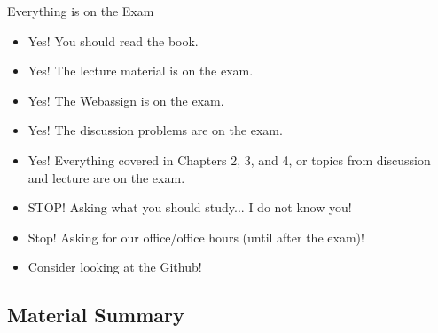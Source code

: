 \documentclass[t,10pt,mathserif,xcolor=pst,pdftex]{beamer}
\begin{document}
\begin{frame}{Everything is on the Exam}

\begin{itemize}
\item Yes! You should read the book.
\end{itemize}

\begin{itemize}
\item Yes! The lecture material is on the exam.
\end{itemize}

\begin{itemize}
\item Yes! The Webassign is on the exam.
\end{itemize}

\begin{itemize}
\item Yes! The discussion problems are on the exam.
\end{itemize}

\begin{itemize}
\item Yes! Everything covered in Chapters 2, 3, and 4, or topics from discussion and lecture are on the exam. 
\end{itemize}

\begin{itemize}
\item STOP! Asking what you should study... I do not know you!
\end{itemize}

\begin{itemize}
\item Stop! Asking for our office/office hours (until after the exam)!
\end{itemize}

\begin{itemize}
\item Consider looking at the Github!
\end{itemize}

\end{frame}


\subsection{Material Summary}
\end{document}
